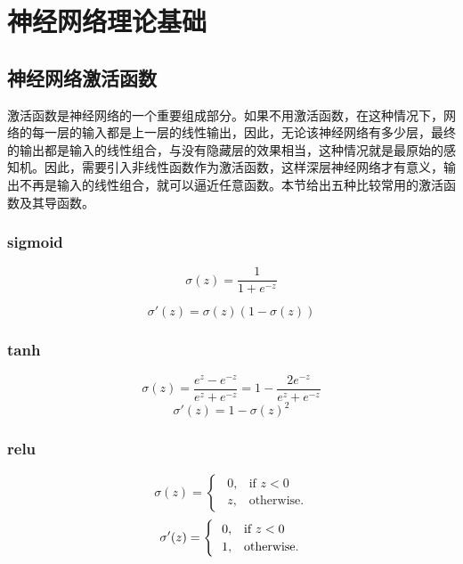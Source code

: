 \documentclass[UTF-8]{progbookcn}
\begin{document}
\chapter{神经网络理论基础}

\section{神经网络激活函数}
激活函数是神经网络的一个重要组成部分。如果不用激活函数，在这种情况下，网络的每一层的输入都是上一层的线性输出，因此，无论该神经网络有多少层，最终的输出都是输入的线性组合，与没有隐藏层的效果相当，这种情况就是最原始的感知机。因此，需要引入非线性函数作为激活函数，这样深层神经网络才有意义，输出不再是输入的线性组合，就可以逼近任意函数\cite{DBLP:books/daglib/0040158}。本节给出五种比较常用的激活函数及其导函数。

\subsection{sigmoid\cite{DBLP:journals/mcss/Cybenko89}}
\begin{equation}\label{E11}
  \sigma(z) = \frac{1}{1+e^{-z}}
\end{equation}

\begin{equation}\label{E12}
  \sigma'(z) = \sigma(z)(1-\sigma(z))
\end{equation}



\subsection{tanh}
  \begin{equation}\label{E21}
    \sigma(z) = \frac{e^z-e^{-z}}{e^z+e^{-z}} = 1- \frac{2e^{-z}}{e^z + e^{-z}}
  \end{equation}
  \begin{equation}\label{E22}
    \sigma'(z) = 1-\sigma(z)^2
  \end{equation}


\subsection{relu\cite{Maas13rectifiernonlinearities}}
 \begin{equation}\label{E31}
    \sigma(z) = \begin{cases}
                   ~~0, & \mbox{if } z<0 \\
                   ~~z, & \mbox{otherwise}.
                 \end{cases}
 \end{equation}
 \begin{equation}\label{E32}
    \sigma'(z) = \begin{cases}
                   ~~0, & \mbox{if } z<0 \\
                   ~~1, & \mbox{otherwise}.
                 \end{cases}  \\
  \end{equation}
\end{document}
